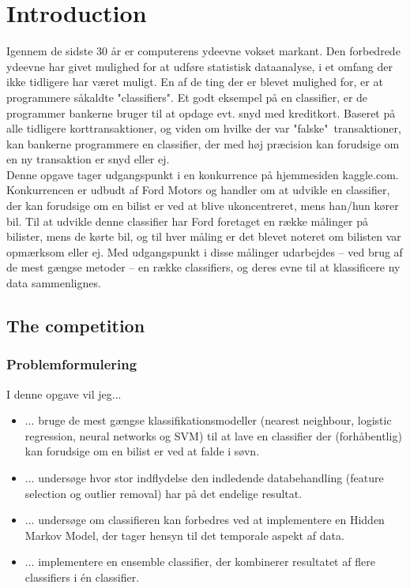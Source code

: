 \chapter{Introduction}
Igennem de sidste 30 år er computerens ydeevne vokset markant. Den forbedrede ydeevne har givet mulighed for at udføre statistisk dataanalyse, i et omfang der ikke tidligere har været muligt. En af de ting der er blevet mulighed for, er at programmere såkaldte "classifiers". Et godt eksempel på en classifier, er de programmer bankerne bruger til at opdage evt. snyd med kreditkort. Baseret på alle tidligere korttransaktioner, og viden om hvilke der var "falske"\ transaktioner, kan bankerne programmere en classifier, der med høj præcision kan forudsige om en ny transaktion er snyd eller ej. \\
Denne opgave tager udgangspunkt i en konkurrence på hjemmesiden kaggle.com. Konkurrencen er udbudt af Ford Motors og handler om at udvikle en classifier, der kan forudsige om en bilist er ved at blive ukoncentreret, mens han/hun kører bil. Til at udvikle denne classifier har Ford foretaget en række målinger på bilister, mens de kørte bil, og til hver måling er det blevet noteret om bilisten var opmærksom eller ej. Med udgangspunkt i disse målinger udarbejdes -- ved brug af de mest gængse metoder -- en række classifiers, og deres evne til at klassificere ny data sammenlignes.

\section{The competition} %
\label{sec:The competition}


\subsection{Problemformulering}
I denne opgave vil jeg...
\begin{itemize}
    \item ... bruge de mest gængse klassifikationsmodeller (nearest neighbour, logistic regression, neural networks og SVM) til at lave en classifier der (forhåbentlig) kan forudsige om en bilist er ved at falde i søvn.
    \item ... undersøge hvor stor indflydelse den indledende databehandling (feature selection og outlier removal) har på det endelige resultat.
    \item ... undersøge om classifieren kan forbedres ved at implementere en Hidden Markov Model, der tager hensyn til det temporale aspekt af data.
    \item ... implementere en ensemble classifier, der kombinerer resultatet af flere classifiers i én classifier.
\end{itemize}

